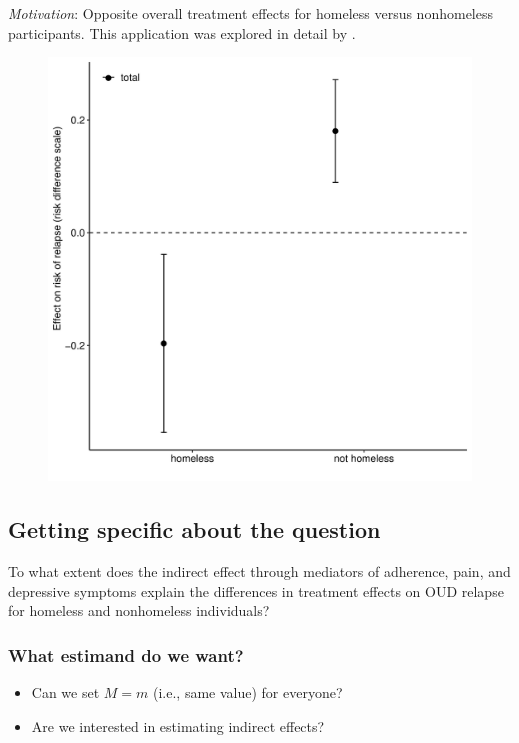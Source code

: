 \documentclass[
  12pt,
]{book}
\providecommand{\tightlist}{%
  \setlength{\itemsep}{0pt}\setlength{\parskip}{0pt}}
\theoremstyle{definition}
\theoremstyle{definition}
\theoremstyle{definition}
\newcommand{\1}{\mathbbm{1}}
\begin{document}
\emph{Motivation}: Opposite overall treatment effects for homeless versus nonhomeless
participants. This application was explored in detail by \citet{rudolph2020explaining}.

\begin{figure}

{\centering \includegraphics[width=0.75\linewidth]{img/tmleesttotal} 

}

\end{figure}

\hypertarget{getting-specific-about-the-question}{%
\subsection{Getting specific about the question}\label{getting-specific-about-the-question}}

To what extent does the indirect effect through mediators of adherence, pain,
and depressive symptoms explain the differences in treatment effects on OUD
relapse for homeless and nonhomeless individuals?

\hypertarget{what-estimand-do-we-want}{%
\subsubsection*{What estimand do we want?}\label{what-estimand-do-we-want}}


\begin{itemize}
\tightlist
\item
  Can we set \(M=m\) (i.e., same value) for everyone?
\item
  Are we interested in estimating indirect effects?
\end{itemize}
\end{document}
